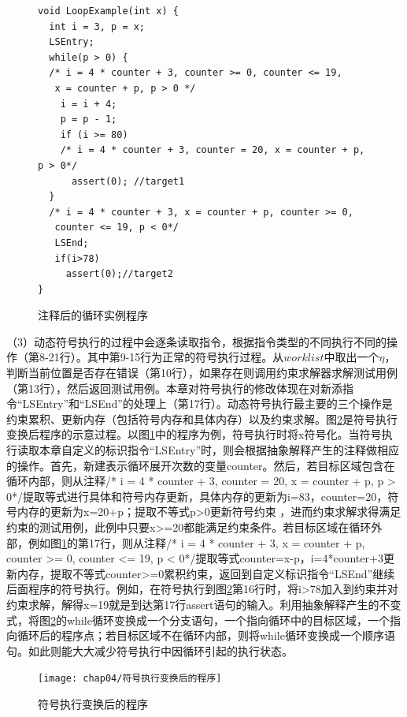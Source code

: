 \begin{figure}[h]
\begin{lstlisting}
void LoopExample(int x) {
  int i = 3, p = x;
  LSEntry;
  while(p > 0) {
  /* i = 4 * counter + 3, counter >= 0, counter <= 19,
   x = counter + p, p > 0 */
    i = i + 4;
    p = p - 1;
	if (i >= 80)
	/* i = 4 * counter + 3, counter = 20, x = counter + p, p > 0*/
	  assert(0); //target1
  }
  /* i = 4 * counter + 3, x = counter + p, counter >= 0, 
   counter <= 19, p < 0*/
   LSEnd;
   if(i>78)
     assert(0);//target2
}
\end{lstlisting}
\caption{注释后的循环实例程序}
\label{fig-example3}
\end{figure}

（3）动态符号执行的过程中会逐条读取指令，根据指令类型的不同执行不同的操作（第8-21行）。其中第9-15行为正常的符号执行过程。从$worklist$中取出一个$\eta$，判断当前位置是否存在错误（第10行），如果存在则调用约束求解器求解测试用例（第13行），然后返回测试用例。本章对符号执行的修改体现在对新添指令“LSEntry”和“LSEnd”的处理上（第17行）。动态符号执行最主要的三个操作是约束累积、更新内存（包括符号内存和具体内存）以及约束求解。图\ref{符号执行变换后的程序}是符号执行变换后程序的示意过程。以图\ref{fig-example3}中的程序为例，符号执行时将x符号化。当符号执行读取本章自定义的标识指令“LSEntry”时，则会根据抽象解释产生的注释做相应的操作。首先，新建表示循环展开次数的变量counter。然后，若目标区域包含在循环内部，则从注释/* i = 4 * counter + 3, counter = 20, x = counter + p, p > 0*/提取等式进行具体和符号内存更新，具体内存的更新为i=83，counter=20，符号内存的更新为x=20+p；提取不等式p>0更新符号约束
，进而约束求解求得满足约束的测试用例，此例中只要x>=20都能满足约束条件。若目标区域在循环外部，例如图\ref{fig-example3}的第17行，则从注释/* i = 4 * counter + 3, x = counter + p, counter >= 0, 
   counter <= 19, p < 0*/提取等式counter=x-p，i=4*counter+3更新内存，提取不等式counter>=0累积约束，返回到自定义标识指令“LSEnd”继续后面程序的符号执行。例如，在符号执行到图\ref{符号执行变换后的程序}第16行时，将i>78加入到约束并对约束求解，解得x=19就是到达第17行assert语句的输入。利用抽象解释产生的不变式，将图\ref{符号执行变换后的程序}的while循环变换成一个分支语句，一个指向循环中的目标区域，一个指向循环后的程序点；若目标区域不在循环内部，则将while循环变换成一个顺序语句。如此则能大大减少符号执行中因循环引起的执行状态。

\begin{figure}[htb]
\begin{center}
\texttt{[image: chap04/符号执行变换后的程序]}
\end{center}
\caption{符号执行变换后的程序}
\label{符号执行变换后的程序}
\end{figure}

